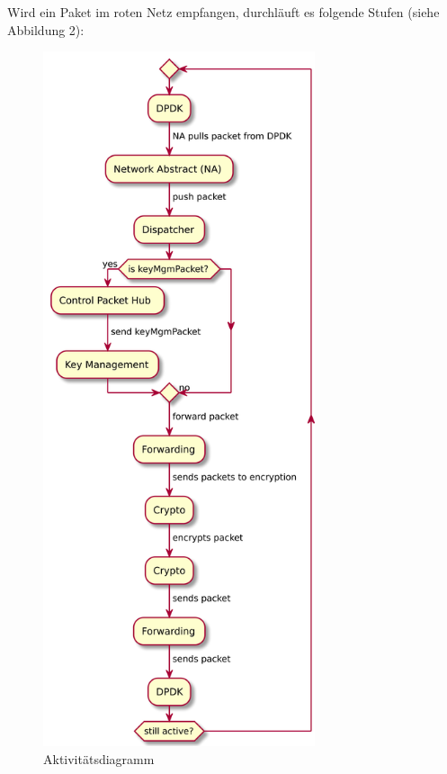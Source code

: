 \documentclass[a4paper, 11pt, ngerman, fleqn]{article}
\begin{document}
Wird ein Paket im roten Netz empfangen, durchläuft es folgende Stufen (siehe Abbildung 2):
\begin{figure}
	\begin{center}
		\includegraphics[width = 8cm]{figures/activityDiagram.pdf}
		\caption{Aktivitätsdiagramm}
	\end{center}
\end{figure}
\end{document}
